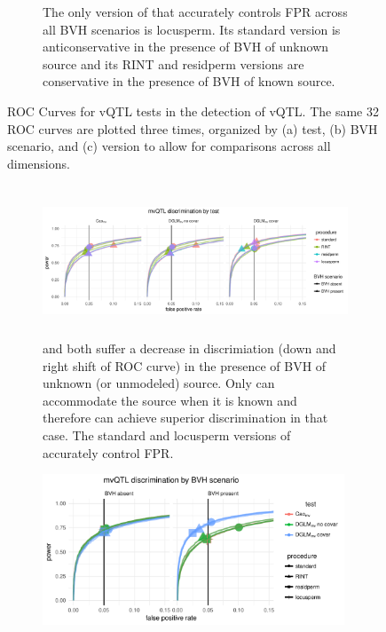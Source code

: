 \begin{figure}[ht]
\begin{subfigure}{\textwidth}
          \caption{
          The only version of \DGLMv that accurately controls FPR across all BVH scenarios is locusperm.
          Its standard version is anticonservative in the presence of BVH of unknown source and its RINT and residperm versions are conservative in the presence of BVH of known source.
          }
      \end{subfigure}
      \caption[
        ROC Curves for vQTL tests in the detection of vQTL.
      ]
      {
        ROC Curves for vQTL tests in the detection of vQTL.
        The same 32 ROC curves are plotted three times, organized by (a) test, (b) BVH scenario, and (c) version to allow for comparisons across all dimensions.
      }
      \label{fig:vqtl_rocs_supp}
  \end{figure}


  \begin{figure}[ht]
      \begin{subfigure}{\textwidth}
          \centering
          \includegraphics[height = 4.5cm]{images/rocs_mvqtl_all_facet_by_test.pdf}
          \caption{
          \Caomv and \DGLMmv both suffer a decrease in discrimiation (down and right shift of ROC curve) in the presence of BVH of unknown (or unmodeled) source.
          Only \DGLMmv can accommodate the source when it is known and therefore can achieve superior discrimination in that case.
          The standard and locusperm versions of \DGLMmv accurately control FPR.
          }
      \vspace*{0.5cm}
      \end{subfigure}
      \begin{subfigure}{\textwidth}
          \centering
          \includegraphics[height = 4.5cm]{images/rocs_mvqtl_all_facet_by_bvh.pdf}

\end{subfigure}
\end{figure}
